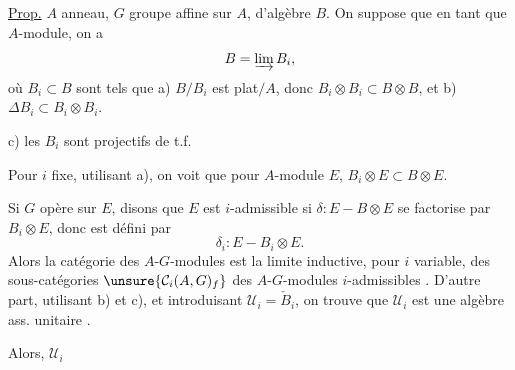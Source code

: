 \uline{Prop.} $A$ anneau, $G$ groupe affine sur $A$, d'algèbre $B$. On suppose que en tant que $A$-module, on a
\[
B=\varinjlim B_i,
\]
où $B_i\subset B$ sont tels que a) $B/B_i$ est plat$/A$,  donc \deleted{$\unsure{\Delta}$} $B_i\otimes B_i\subset B\otimes B$, et b) $\Delta B_i\subset B_i\otimes B_i$.

 c) les $B_i$ sont projectifs de t.f.

 Pour $i$ fixe, utilisant a), on voit que pour  $A$-module $E$, $B_i\otimes E\subset B\otimes E$.

Si $G$ opère sur $E$, disons que $E$ est $i$-admissible si $\delta:E-B\otimes E$ se factorise par $B_i\otimes E$, donc est défini par
\[
\delta_i:E-B_i\otimes E.
\]
Alors la catégorie des $A$-$G$-modules  est la limite inductive, pour $i$ variable, des sous-catégories $\unsure{\mathcal C_i(A,G)_f}$ des $A$-$G$-modules $i$-admissibles . D'autre part, utilisant b) et c), et introduisant $\mathcal U_i=\check B_i$, on trouve que $\mathcal U_i$ est une algèbre ass. unitaire .


Alors,  $\mathcal U_i$
